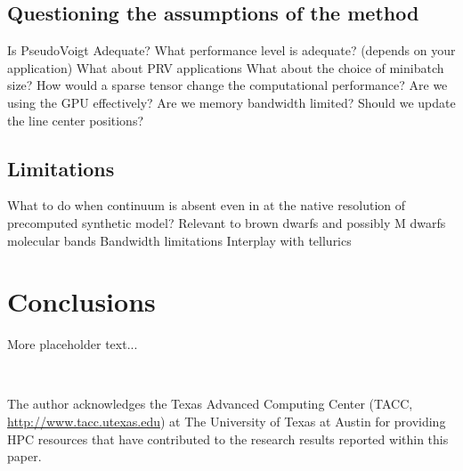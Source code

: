 \documentclass[modern]{aastex631}
\begin{document}
\subsection{Questioning the assumptions of the method}
\begin{outline}
  \1 Is PseudoVoigt Adequate?
  \1 What performance level is adequate? (depends on your application)
  \1 What about PRV applications
  \1 What about the choice of minibatch size?
  \1 How would a sparse tensor change the computational performance?
  \1 Are we using the GPU effectively?  Are we memory bandwidth limited?
  \1 Should we update the line center positions?
\end{outline}

\subsection{Limitations}
\begin{outline}
  \1 What to do when continuum is absent even in at the native resolution of precomputed synthetic model?
  \1 Relevant to brown dwarfs and possibly M dwarfs molecular bands
  \1 Bandwidth limitations
  \1 Interplay with tellurics
\end{outline}

\section{Conclusions}
More placeholder text...


\

\begin{acknowledgements}
  The author acknowledges the Texas Advanced Computing Center (TACC, \url{http://www.tacc.utexas.edu}) at The University of Texas at Austin for providing HPC resources that have contributed to the research results reported within this paper.
\end{acknowledgements}

\clearpage








\clearpage
\end{document}
